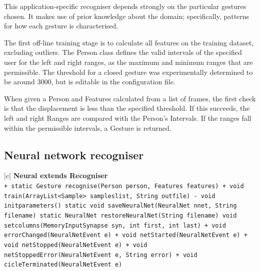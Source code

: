 \documentclass[12pt,a4,notitlepage]{report}
\renewcommand{\_}{\texttt{\symbol{95}}}
\newcommand{\<}{\texttt{\symbol{60}}}
\renewcommand{\>}{\texttt{\symbol{62}}}
\newcommand{\class}[1]{\textbf{#1}}
\newcommand{\variable}[1]{\texttt{#1}}
\begin{document}
{This application-specific recogniser depends strongly on the particular gestures chosen. It makes use of prior knowledge about the domain; specifically, patterns for how each gesture is characterised.

The first off-line training stage is to calculate all features on the training dataset, excluding outliers. The Person class defines the valid intervals of the specified user for the left and right ranges, as the maximum and minimum ranges that are permissible. The threshold for a closed gesture was experimentally determined to be around 3000, but is editable in the configuration file.

When given a Person and Features calculated from a list of frames, the first check is that the displacement is less than the specified threshold. If this succeeds, the left and right Ranges are compared with the Person's Intervals. If the ranges fall within the permissible intervals, a Gesture is returned.

\newpage

\subsection{Neural network recogniser}

\begin{tabular}{|c|} \hline 
\class{Neural extends Recogniser} \\ \hline
{}
{ \variable{+ static Gesture recognise(Person person, Features features) \newline
+ void train(ArrayList<Sample> sampleslist, String out\_file) \newline
- void init\_parameters() \newline
static void saveNeuralNet(NeuralNet nnet, String filename) \newline
static NeuralNet restoreNeuralNet(String filename) \newline
void set\_columns(MemoryInputSynapse syn, int first, int last) \newline
+ void errorChanged(NeuralNetEvent e) \newline
+ void netStarted(NeuralNetEvent e) \newline
+ void netStopped(NeuralNetEvent e) \newline
+ void netStoppedError(NeuralNetEvent e, String error) \newline
+ void cicleTerminated(NeuralNetEvent e)
} } \\ \hline
\end{tabular}

}
\end{document}
